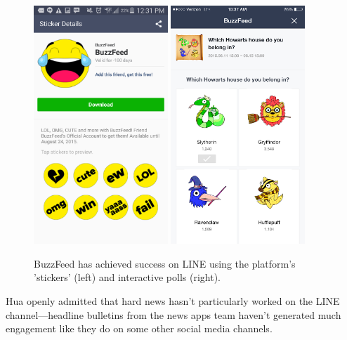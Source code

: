 \documentclass[notoc, symmetric, nobib, nols]{towcenter-guideto-book}
\begin{document}
\begin{figure}
\begin{center}
\includegraphics[width=0.45\textwidth]{graphics/CHATAPPS_Page15_BF2.png}
\includegraphics[width=0.45\textwidth]{graphics/CHATAPPS_Page15_BF3.png}
\caption{BuzzFeed has achieved success on LINE using the platform's 'stickers' (left) and interactive polls (right).}
\end{center}
\end{figure}

Hua openly admitted that hard news hasn't particularly worked on the LINE channel---headline bulletins from the news apps team haven't generated much engagement like they do on some other social media channels.
\end{document}
